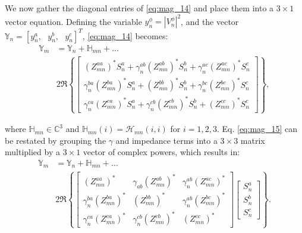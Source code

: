 We now gather the diagonal entries of \eqref{eq:mag_14} and place them into a $3 \times 1$ vector equation.  Defining the variable $y_{n}^{\phi} = | V_{n}^{\phi} |^{2}$, and the vector $\mathbb{Y}_{n} = \left[ y_{n}^{a}, \text{ } y_{n}^{b}, \text{ } y_{n}^{c} \right]^{T}$, \eqref{eq:mag_14} becomes:
\begin{align}
	\mathbb{Y}_{m} &= \mathbb{Y}_{n} + \mathbb{H}_{mn} + \ldots \nonumber \\
    & 2 \Re \left\{
    \begin{bmatrix}
    	(Z_{mn}^{aa})^{*} S_{n}^{a}  + \gamma_{n}^{ab} (Z_{mn}^{ab})^{*} S_{n}^{b}  + \gamma_{n}^{ac} (Z_{mn}^{ac})^{*} S_{n}^{c} \\
    	\gamma_{n}^{ba} (Z_{mn}^{ba})^{*} S_{n}^{a} + (Z_{mn}^{bb})^{*} S_{n}^{b} + \gamma_{n}^{bc} (Z_{mn}^{bc})^{*} S_{n}^{c} \\
    	\gamma_{n}^{ca} (Z_{mn}^{ca})^{*} S_{n}^{a} + \gamma_{n}^{cb} (Z_{mn}^{cb})^{*} S_{n}^{b} + (Z_{mn}^{cc})^{*} S_{n}^{c}
    \end{bmatrix}
	\right\}
    \label{eq:mag_15},
\end{align}

\noindent where $\mathbb{H}_{mn} \in \mathbb{C}^{3}$ and $\mathbb{H}_{mn}(i) = \mathcal H_{mn}(i,i)$ for $i = 1,2,3$.  Eq. \eqref{eq:mag_15} can be restated by grouping the $\gamma$ and impedance terms into a $3\times 3$ matrix multiplied by a $3 \times 1$ vector of complex powers, which results in:
\begin{align}
	\mathbb{Y}_{m} &= \mathbb{Y}_{n} + \mathbb{H}_{mn} + \ldots \nonumber \\
    &2 \Re \left\{
    \begin{bmatrix}
    	(Z_{mn}^{aa})^{*} & \gamma_{ab} (Z_{mn}^{ab})^{*} & \gamma_{n}^{ab} (Z_{mn}^{ac})^{*} \\
    	\gamma_{n}^{ba} (Z_{mn}^{ba})^{*} & (Z_{mn}^{bb})^{*} & \gamma_{n}^{ab} (Z_{mn}^{bc})^{*} \\
    	\gamma_{n}^{ca} (Z_{mn}^{ca})^{*} & \gamma_{n}^{cb} (Z_{mn}^{cb})^{*} & (Z_{mn}^{cc})^{*}
    \end{bmatrix}
    \begin{bmatrix}
    	S_{n}^{a} \\ S_{n}^{b} \\ S_{n}^{c}
    \end{bmatrix}
	\right\}
    \label{eq:mag_16}.
\end{align}

